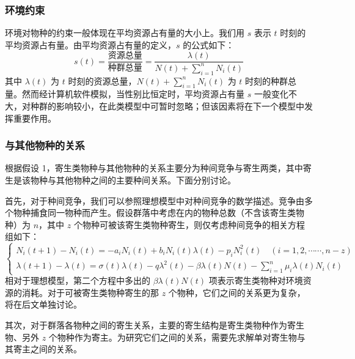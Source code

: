 \documentclass[11pt,a4paper]{ctexart}
\begin{document}
\subsubsection{环境约束}

环境对物种的约束一般体现在平均资源占有量的大小上。我们用 $s$ 表示 $t$ 时刻的平均资源占有量。由平均资源占有量的定义，$s$ 的公式如下：
\begin{equation}
s(t)=\frac{\text{资源总量}}{\text{种群总量}}=\frac{\lambda(t)}{N(t)+\sum\limits_{i=1}^{n}N_{i}(t)}
\end{equation}
其中 $\lambda(t)$ 为 $t$ 时刻的资源总量，$N(t)+\sum_{i=1}^{n}N_{i}(t)$ 为 $t$ 时刻的种群总量。然而经计算机软件模拟，当性别比恒定时，平均资源占有量 $s$ 一般变化不大，对种群的影响较小，在此类模型中可暂时忽略；但该因素将在下一个模型中发挥重要作用。

\subsubsection{与其他物种的关系}

根据假设 1，寄生类物种与其他物种的关系主要分为种间竞争与寄生两类，其中寄生是该物种与其他物种之间的主要种间关系。下面分别讨论。

首先，对于种间竞争，我们可以参照理想模型中对种间竞争的数学描述。竞争由多个物种捕食同一物种而产生。假设群落中考虑在内的物种总数（不含该寄生类物种）为 $n$，其中 $z$ 个物种可被该寄生类物种寄生，则仅考虑种间竞争的相关方程组如下：
\begin{equation}
\begin{cases}
N_{i}(t+1)-N_{i}(t)=-a_{i}N_{i}(t)+b_{i}N_{i}(t)\lambda(t)-p_{i}N_{i}^{2}(t)\quad (i=1,2,\cdots\cdots,n-z)\\[6pt]
\lambda(t+1)-\lambda(t)=\sigma(t)\lambda(t)-q\lambda^{2}(t)-\beta\lambda(t)N(t)-\sum\limits_{i=1}^{n}\mu_{i}\lambda(t)N_{i}(t)
\end{cases}
\end{equation}
相对于理想模型，第二个方程中多出的 $\beta\lambda(t)N(t)$ 项表示寄生类物种对环境资源的消耗。对于可被寄生类物种寄生的那 $z$ 个物种，它们之间的关系更为复杂，将在后文单独讨论。

其次，对于群落各物种之间的寄生关系，主要的寄生结构是寄生类物种作为寄生物、另外 $z$ 个物种作为寄主。为研究它们之间的关系，需要先求解单对寄生物与其寄主之间的关系。
\end{document}
